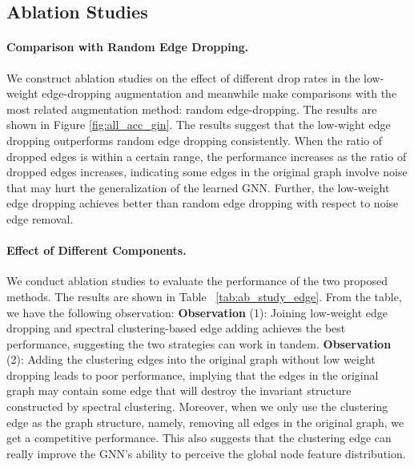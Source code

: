 \subsection{Ablation Studies}
\paragraph{Comparison with Random Edge Dropping.} We construct ablation studies on the effect of different drop rates in the low-weight edge-dropping augmentation and meanwhile make comparisons with the most related augmentation method: random edge-dropping. The results are shown in Figure \ref{fig:all_acc_gin}.  
The results suggest that the low-wight edge dropping outperforms random edge dropping consistently. When the ratio of dropped edges is within a certain range, the performance increases as the ratio of dropped edges increases, indicating some edges in the original graph involve noise that may hurt the generalization of the learned GNN. Further, the low-weight edge dropping achieves better than random edge dropping  with respect to noise edge removal.

\paragraph{Effect of Different Components.}
We conduct ablation studies to evaluate the performance of the two proposed methods. The results are shown in Table ~\ref{tab:ab_study_edge}. From the table, we have the following observation: \textbf{Observation} (1): Joining low-weight edge dropping and spectral clustering-based edge adding achieves the best performance, suggesting the two strategies can work in tandem. \textbf{Observation} (2): Adding the clustering edges into the original graph without low weight dropping leads to poor performance, implying that the edges in the original graph may contain some edge that will destroy the invariant structure constructed by spectral clustering.
Moreover, when we only use the clustering edge as the graph structure, namely, removing all edges in the original graph, we get a competitive performance. This also suggests that the clustering edge can really improve the GNN's ability to perceive the global node feature distribution. 






